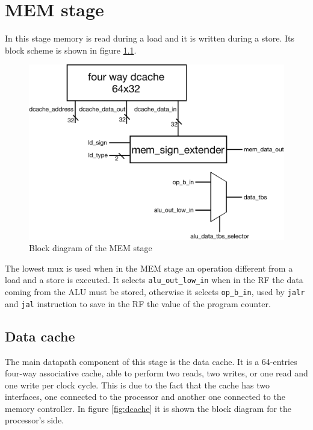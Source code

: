 \chapter{MEM stage}
\label{chap:mem}

In this stage memory is read during a load and it is written during a store. Its block scheme is shown in figure \ref{fig:MEM_stage}.

\begin{figure}[!ht]
	\centering
	\includegraphics[width=.7\linewidth]{./chapters/figures/MEM_stage.pdf}
	\caption{Block diagram of the MEM stage}
	\label{fig:MEM_stage}
\end{figure}

The lowest mux is used when in the MEM stage an operation different from a load and a store is executed. It selects \verb|alu_out_low_in| when in the RF the data coming from the ALU
must be stored, otherwise it selects \verb|op_b_in|, used by \verb|jalr| and \verb|jal| instruction to save in the RF the value of the program counter.

\section{Data cache}

The main datapath component of this stage is the data cache. It is a 64-entries four-way associative cache, able to perform two reads, two writes, or one read and one write per clock cycle.
This is due to the fact that the cache has two interfaces, one connected to the processor and another one connected to the memory controller. In figure \ref{fig:dcache} it is shown
the block diagram for the processor's side.

